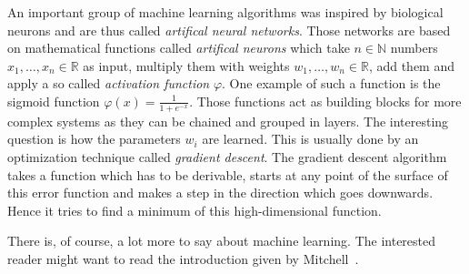 An important group of machine learning algorithms was inspired by biological
neurons and are thus called \textit{artifical neural networks}. Those networks
are based on mathematical functions called \textit{artifical neurons} which
take $n \in \mathbb{N}$ numbers $x_1, \dots, x_n \in \mathbb{R}$ as input,
multiply them with weights $w_1, \dots, w_n \in \mathbb{R}$, add them and apply
a so called \textit{activation function} $\varphi$. One example of such a
function is the sigmoid function $\varphi(x) = \frac{1}{1+e^{-x}}$. Those
functions act as building blocks for more complex systems as they can be
chained and grouped in layers. The interesting question is how the parameters
$w_i$ are learned. This is usually done by an optimization technique called
\textit{gradient descent}. The gradient descent algorithm takes a function
which has to be derivable, starts at any point of the surface of this error
function and makes a step in the direction which goes downwards. Hence it tries
to find a minimum of this high-dimensional function.

There is, of course, a lot more to say about machine learning. The interested
reader might want to read the introduction given by Mitchell~\cite{Mitchell97}.
